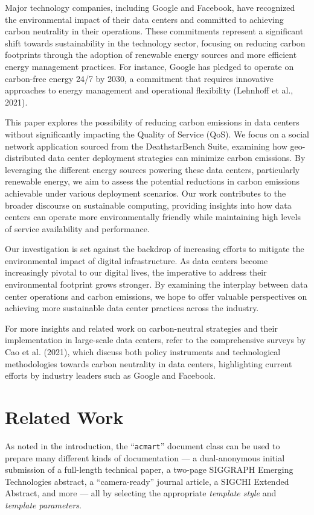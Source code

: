 \documentclass[acmlarge]{acmart}
\begin{document}
	Major technology companies, including Google and Facebook, have recognized the environmental impact of their data centers and committed to achieving carbon neutrality in their operations. These commitments represent a significant shift towards sustainability in the technology sector, focusing on reducing carbon footprints through the adoption of renewable energy sources and more efficient energy management practices. For instance, Google has pledged to operate on carbon-free energy 24/7 by 2030, a commitment that requires innovative approaches to energy management and operational flexibility (Lehnhoff et al., 2021).
	
	This paper explores the possibility of reducing carbon emissions in data centers without significantly impacting the Quality of Service (QoS). We focus on a social network application sourced from the DeathstarBench Suite, examining how geo-distributed data center deployment strategies can minimize carbon emissions. By leveraging the different energy sources powering these data centers, particularly renewable energy, we aim to assess the potential reductions in carbon emissions achievable under various deployment scenarios. Our work contributes to the broader discourse on sustainable computing, providing insights into how data centers can operate more environmentally friendly while maintaining high levels of service availability and performance.
	
	Our investigation is set against the backdrop of increasing efforts to mitigate the environmental impact of digital infrastructure. As data centers become increasingly pivotal to our digital lives, the imperative to address their environmental footprint grows stronger. By examining the interplay between data center operations and carbon emissions, we hope to offer valuable perspectives on achieving more sustainable data center practices across the industry.
	
	For more insights and related work on carbon-neutral strategies and their implementation in large-scale data centers, refer to the comprehensive surveys by Cao et al. (2021), which discuss both policy instruments and technological methodologies towards carbon neutrality in data centers, highlighting current efforts by industry leaders such as Google and Facebook.
	
	\section{Related Work}
	As noted in the introduction, the ``\verb|acmart|'' document class can
	be used to prepare many different kinds of documentation --- a
	dual-anonymous initial submission of a full-length technical paper, a
	two-page SIGGRAPH Emerging Technologies abstract, a ``camera-ready''
	journal article, a SIGCHI Extended Abstract, and more --- all by
	selecting the appropriate {\itshape template style} and {\itshape
		template parameters}.
	
\end{document}
